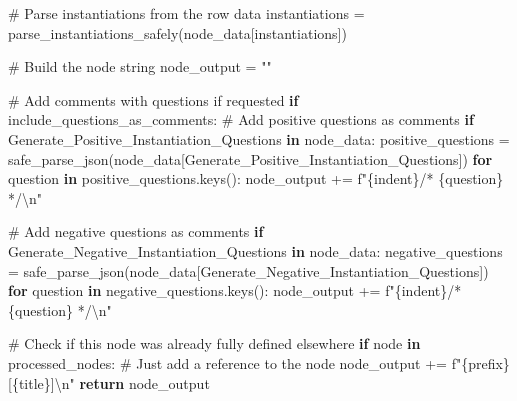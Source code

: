 \documentclass[
  11pt,
  letterpaper,
]{book}
\newenvironment{Shaded}{\begin{snugshade}}{\end{snugshade}}
\newcommand{\CharTok}[1]{\textcolor[rgb]{0.13,0.47,0.30}{#1}}
\newcommand{\CommentTok}[1]{\textcolor[rgb]{0.37,0.37,0.37}{#1}}
\newcommand{\ControlFlowTok}[1]{\textcolor[rgb]{0.00,0.23,0.31}{\textbf{#1}}}
\newcommand{\KeywordTok}[1]{\textcolor[rgb]{0.00,0.23,0.31}{\textbf{#1}}}
\newcommand{\NormalTok}[1]{\textcolor[rgb]{0.00,0.23,0.31}{#1}}
\newcommand{\OperatorTok}[1]{\textcolor[rgb]{0.37,0.37,0.37}{#1}}
\newcommand{\SpecialCharTok}[1]{\textcolor[rgb]{0.37,0.37,0.37}{#1}}
\newcommand{\SpecialStringTok}[1]{\textcolor[rgb]{0.13,0.47,0.30}{#1}}
\newcommand{\StringTok}[1]{\textcolor[rgb]{0.13,0.47,0.30}{#1}}
\begin{document}
\begin{Shaded}
\begin{Highlighting}[]
      \CommentTok{\# Parse instantiations from the row data}
\NormalTok{      instantiations }\OperatorTok{=}\NormalTok{ parse\_instantiations\_safely(node\_data[}\StringTok{\textquotesingle{}instantiations\textquotesingle{}}\NormalTok{])}

      \CommentTok{\# Build the node string}
\NormalTok{      node\_output }\OperatorTok{=} \StringTok{""}

      \CommentTok{\# Add comments with questions if requested}
      \ControlFlowTok{if}\NormalTok{ include\_questions\_as\_comments:}
          \CommentTok{\# Add positive questions as comments}
          \ControlFlowTok{if} \StringTok{\textquotesingle{}Generate\_Positive\_Instantiation\_Questions\textquotesingle{}} \KeywordTok{in}\NormalTok{ node\_data:}
\NormalTok{              positive\_questions }\OperatorTok{=}\NormalTok{ safe\_parse\_json(node\_data[}\StringTok{\textquotesingle{}Generate\_Positive\_Instantiation\_Questions\textquotesingle{}}\NormalTok{])}
              \ControlFlowTok{for}\NormalTok{ question }\KeywordTok{in}\NormalTok{ positive\_questions.keys():}
\NormalTok{                  node\_output }\OperatorTok{+=} \SpecialStringTok{f"}\SpecialCharTok{\{}\NormalTok{indent}\SpecialCharTok{\}}\SpecialStringTok{/* }\SpecialCharTok{\{}\NormalTok{question}\SpecialCharTok{\}}\SpecialStringTok{ */}\CharTok{\textbackslash{}n}\SpecialStringTok{"}

          \CommentTok{\# Add negative questions as comments}
          \ControlFlowTok{if} \StringTok{\textquotesingle{}Generate\_Negative\_Instantiation\_Questions\textquotesingle{}} \KeywordTok{in}\NormalTok{ node\_data:}
\NormalTok{              negative\_questions }\OperatorTok{=}\NormalTok{ safe\_parse\_json(node\_data[}\StringTok{\textquotesingle{}Generate\_Negative\_Instantiation\_Questions\textquotesingle{}}\NormalTok{])}
              \ControlFlowTok{for}\NormalTok{ question }\KeywordTok{in}\NormalTok{ negative\_questions.keys():}
\NormalTok{                  node\_output }\OperatorTok{+=} \SpecialStringTok{f"}\SpecialCharTok{\{}\NormalTok{indent}\SpecialCharTok{\}}\SpecialStringTok{/* }\SpecialCharTok{\{}\NormalTok{question}\SpecialCharTok{\}}\SpecialStringTok{ */}\CharTok{\textbackslash{}n}\SpecialStringTok{"}

      \CommentTok{\# Check if this node was already fully defined elsewhere}
      \ControlFlowTok{if}\NormalTok{ node }\KeywordTok{in}\NormalTok{ processed\_nodes:}
          \CommentTok{\# Just add a reference to the node}
\NormalTok{          node\_output }\OperatorTok{+=} \SpecialStringTok{f"}\SpecialCharTok{\{}\NormalTok{prefix}\SpecialCharTok{\}}\SpecialStringTok{[}\SpecialCharTok{\{}\NormalTok{title}\SpecialCharTok{\}}\SpecialStringTok{]}\CharTok{\textbackslash{}n}\SpecialStringTok{"}
          \ControlFlowTok{return}\NormalTok{ node\_output}


\end{Highlighting}
\end{Shaded}
\end{document}

